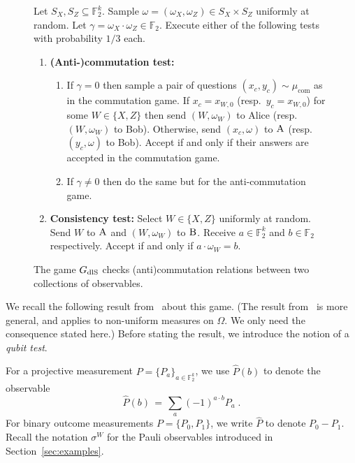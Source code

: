 \documentclass[11pt]{article}
\theoremstyle{definition}
\newcommand{\field}{\mathbb{F}_2}
\newcommand{\dlS}{\ensuremath{\rm dlS}}
\newcommand{\F}{\ensuremath{\mathbb{F}}}
\newcommand{\cc}{\mathrm{com}}
\newcommand{\labelstyle}[1]{\ensuremath{\textsc{#1}}\xspace}
\newcommand{\alice}{\labelstyle{A}}
\newcommand{\bob}{\labelstyle{B}}
\newenvironment{gamespec}{
  \begin{mdframed}[style=figstyle]}{
  \end{mdframed}}
\begin{document}
\begin{figure}[!htbp]
  \centering
  \begin{gamespec}
Let $S_X,S_Z\subseteq \field^k$.  Sample $\omega = (\omega_X,\omega_Z)\in S_X \times S_Z $ uniformly at random. Let $\gamma = \omega_X \cdot \omega_Z \in \field$. Execute either of the following tests with probability $1/3$ each. 
    \begin{enumerate}
      \setlength\itemsep{1pt}
    \item \textbf{(Anti-)commutation test:} 
		\begin{enumerate}
		\item If $\gamma=0$ then sample a pair of questions $(x_c,y_c)\sim\mu_\cc$ as in the commutation game. If $x_c = x_{W,0}$ (resp.\ $y_c=x_{W,0}$) for some $W\in \{X,Z\}$ then send $(W,\omega_W)$ to Alice (resp.\ $(W,\omega_W)$ to Bob). Otherwise, send $(x_c,\omega)$ to $\alice$ (resp.\ $(y_c,\omega)$ to Bob). Accept if and only if their answers are accepted in the commutation game. 
		\item If $\gamma\neq 0$ then do the same but for the anti-commutation game. 
		\end{enumerate} 
		 \item \textbf{Consistency test:} Select $W\in\{X,Z\}$ uniformly at random. Send $W$ to $\alice$ and $(W,\omega_W)$ to $\bob$. Receive $a\in \field^k$ and $b\in \field$ respectively. Accept if and only if $a\cdot \omega_W=b$. 
    \end{enumerate}
  \end{gamespec}
  \caption{The game $G_{\dlS}$ checks (anti)commutation relations between two collections of observables.}
  \label{fig:dlS}
\end{figure}

We recall the following result from~\cite{de2022spectral} about this game. (The result from~\cite{de2022spectral} is more general, and applies to non-uniform measures on $\Omega$. We only need the consequence stated here.) Before stating the result, we introduce the notion of a \emph{qubit test}. 

For a projective measurement $P = \{P_a\}_{a \in \F_2^k}$, we use $\widehat{P}(b)$ to denote the observable
\[\widehat{P}(b) \,=\, \sum_a (-1)^{a\cdot b} P_a\;.\]
For binary outcome measurements $P = \{ P_0, P_1\}$, we write $\widehat{P}$ to denote $P_0 - P_1$. Recall the notation $\sigma^W$ for the Pauli observables introduced in Section~\ref{sec:examples}.
\end{document}
